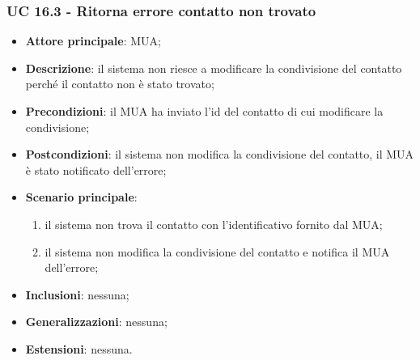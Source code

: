 \subsubsection{UC 16.3 - Ritorna errore contatto non trovato} \label{sec:UC16.3}
    \begin{itemize}
        \item \textbf{Attore principale}: MUA;
        \item \textbf{Descrizione}: il sistema non riesce a modificare la condivisione del contatto perché il contatto non è stato trovato;
        \item \textbf{Precondizioni}: il MUA ha inviato l'id del contatto di cui modificare la condivisione;
        \item \textbf{Postcondizioni}: il sistema non modifica la condivisione del contatto, il MUA è stato notificato dell'errore;
        \item \textbf{Scenario principale}:
            \begin{enumerate}
                \item il sistema non trova il contatto con l'identificativo fornito dal MUA;
                \item il sistema non modifica la condivisione del contatto e notifica il MUA dell'errore;
            \end{enumerate}
        \item \textbf{Inclusioni}: nessuna;
        \item \textbf{Generalizzazioni}: nessuna;
        \item \textbf{Estensioni}: nessuna.
    \end{itemize}

